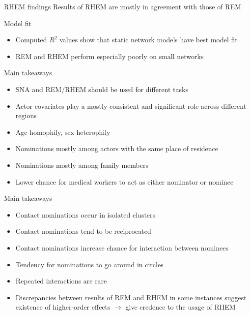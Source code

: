 \documentclass{beamer}
\begin{document}
	\begin{frame}{RHEM findings}
		Results of RHEM are mostly in agreement with those of REM
	\end{frame}

	\begin{frame}{Model fit}
		\begin{itemize}
			\item Computed $R^2$ values show that static network models have best model fit
			\item REM and RHEM perform especially poorly on small networks
		\end{itemize}
	\end{frame}

	\begin{frame}{Main takeaways}
		\begin{itemize}
			\item SNA and REM/RHEM should be used for different tasks
			\item Actor covariates play a mostly consistent and significant role across different regions
			\item Age homophily, sex heterophily
			\item Nominations mostly among actors with the same place of residence
			\item Nominations mostly among family members
			\item Lower chance for medical workers to act as either nominator or nominee
		\end{itemize}
	\end{frame}

	\begin{frame}{Main takeaways}
		\begin{itemize}
			\item Contact nominations occur in isolated clusters
			\item Contact nominations tend to be reciprocated
			\item Contact nominations increase chance for interaction between nominees
			\item Tendency for nominations to go around in circles
			\item Repeated interactions are rare
			\item Discrepancies between results of REM and RHEM in some instances suggest existence of higher-order effects $\rightarrow$ give credence to the usage of RHEM
		\end{itemize}
	\end{frame}
	
\end{document}
